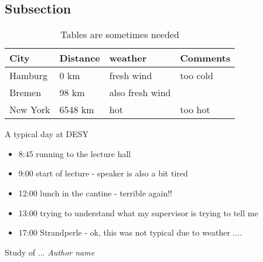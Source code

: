 \documentclass[12pt,oneside,notitlepage,abstracton,a4paper]{scrartcl}
\begin{document}
\subsection{Subsection}

\begin{table}[h]
\caption{ Tables are sometimes needed}
\begin{center}
\begin{tabular}{llll}
\hline
City & Distance & weather & Comments \\ \hline \hline
Hamburg & 0 km & fresh wind  & too cold\\ 
Bremen & 98 km & also fresh wind  & \\ 
New York & 6548 km & hot & too hot  \\ 
\hline 
\end{tabular}
\end{center}
\label{default}
\end{table}%



A typical day at DESY

\begin{itemize}

\item{8:45 running to the lecture hall }

\item{9:00 start of lecture - speaker is also a bit tired }

\item{12:00 lunch in the cantine - terrible again!! }

\item{13:00 trying to understand what my supervisor is trying to tell me}

\item{17:00 Strandperle - ok, this was not typical due to weather ....} 
\end{itemize}

\clearpage 


\begin{thebibliography}{99}
\begin{sloppypar}
 Study of ...
{\em Author name}
\end{sloppypar}
\end{thebibliography}
\end{document}
